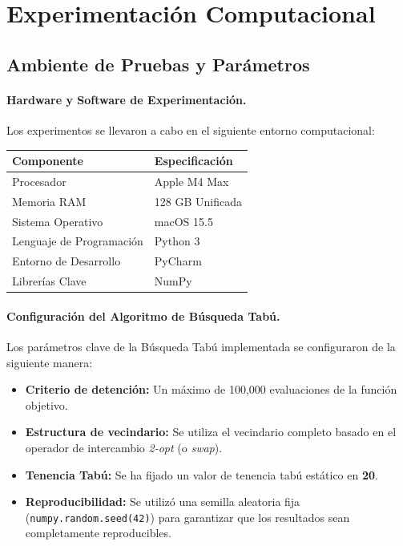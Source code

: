 \documentclass[12pt, a4paper]{article}
\begin{document}
\newpage

\section{Experimentación Computacional}

\subsection{Ambiente de Pruebas y Parámetros}

\paragraph{Hardware y Software de Experimentación.}
Los experimentos se llevaron a cabo en el siguiente entorno computacional:

\begin{center}
\begin{tabular}{ll}
\hline
\textbf{Componente} & \textbf{Especificación} \\
\hline
Procesador & Apple M4 Max \\
Memoria RAM & 128 GB Unificada \\
Sistema Operativo & macOS 15.5 \\
Lenguaje de Programación & Python 3 \\
Entorno de Desarrollo & PyCharm \\
Librerías Clave & NumPy \\
\hline
\end{tabular}
\end{center}

\paragraph{Configuración del Algoritmo de Búsqueda Tabú.}
Los parámetros clave de la Búsqueda Tabú implementada se configuraron de la siguiente manera:
\begin{itemize}
    \item \textbf{Criterio de detención:} Un máximo de 100,000 evaluaciones de la función objetivo.
    \item \textbf{Estructura de vecindario:} Se utiliza el vecindario completo basado en el operador de intercambio \textit{2-opt} (o \textit{swap}).
    \item \textbf{Tenencia Tabú:} Se ha fijado un valor de tenencia tabú estático en \textbf{20}.
    \item \textbf{Reproducibilidad:} Se utilizó una semilla aleatoria fija (\texttt{numpy.random.seed(42)}) para garantizar que los resultados sean completamente reproducibles.
\end{itemize}
\end{document}

